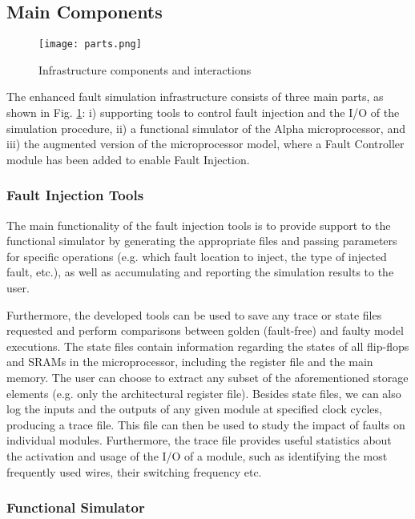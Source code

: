 \documentclass[12pt]{yalephd}
\begin{document}
\subsection{Main Components}

\begin{figure}[!ht]
\centering
\texttt{[image: parts.png]}
\caption{Infrastructure components and interactions}\label{sC2parts}
\end{figure}

The enhanced fault simulation infrastructure consists of three main parts, as shown in Fig. \ref{sC2parts}: i) supporting tools to control fault injection and the I/O of the simulation procedure, ii) a functional simulator of the Alpha microprocessor, and iii) the augmented version of the microprocessor model, where a Fault Controller module has been added to enable Fault Injection.

\subsubsection{Fault Injection Tools}

The main functionality of the fault injection tools is to provide support to the functional simulator by generating the appropriate files and passing parameters for specific operations (e.g. which fault location to inject, the type of injected fault, etc.), as well as accumulating and reporting the simulation results to the user.

Furthermore, the developed tools can be used to save any trace or state files requested and perform comparisons between golden (fault-free) and faulty model executions. The state files contain information regarding the states of all flip-flops and SRAMs in the microprocessor, including the register file and the main memory. The user can choose to extract any subset of the aforementioned storage elements (e.g. only the architectural register file). Besides state files, we can also log the inputs and the outputs of any given module at specified clock cycles, producing a trace file. This file can then be used to study the impact of faults on individual modules. Furthermore, the trace file provides useful statistics about the activation and usage of the I/O of a module, such as identifying the most frequently used wires, their switching frequency etc.

\subsubsection{Functional Simulator}
\end{document}
